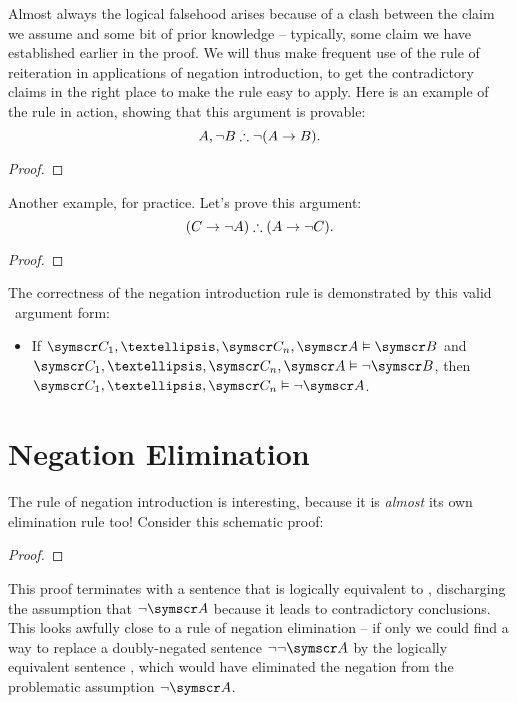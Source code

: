 Almost always the logical falsehood arises because of a clash between the claim we assume and some bit of prior knowledge – typically, some claim we have established earlier in the proof. We will thus make frequent use of the rule of reiteration in applications of negation introduction, to get the contradictory claims in the right place to make the rule easy to apply. Here is an example of the rule in action, showing that this argument is provable: $$A, \neg B \mathrel{\therefore} \neg (A \rightarrow B).$$ \begin{proof}
	\open
	\close
\end{proof}

Another example, for practice. Let's prove this argument: $$(C \rightarrow \neg A) \therefore (A \rightarrow \neg C).$$ \begin{proof}
	\open
	\open
	\close
	\close
\end{proof}


The correctness of the negation introduction rule is demonstrated by this valid \TFL\ argument form: \begin{itemize}
	\item If $\meta{C}_{1},…,\meta{C}_{n},\meta{A} \vDash \meta{B}$ and $\meta{C}_{1},…,\meta{C}_{n},\meta{A} \vDash \enot\meta{B}$, then $\meta{C}_{1},…,\meta{C}_{n} \vDash \enot\meta{A}$. \end{itemize}

\section{Negation Elimination}\label{negelim}

The rule of negation introduction is interesting, because it is \emph{almost} its own elimination rule too! Consider this schematic proof: \begin{proof}
	\open 
	\have[\ ]{}{\vdots}
	\have[\ ]{}{\vdots}
	\close
\end{proof} This proof terminates with a sentence that is logically equivalent to , discharging the assumption that $\enot\meta{A}$ because it leads to contradictory conclusions. This looks awfully close to a rule of negation elimination – if only we could find a way to replace a doubly-negated sentence $\enot\enot\meta{A}$ by the logically equivalent sentence , which would have eliminated the negation from the problematic assumption $\enot\meta{A}$.


